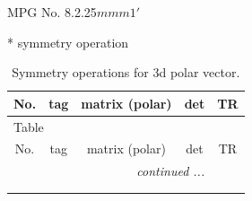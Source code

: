 \documentclass[fleqn,8pt]{jsarticle}
\begin{document}
\setcounter{MaxMatrixCols}{32}

\renewcommand{\tablename}{Table~}
\renewcommand{\figurename}{Figure~}
\begin{center}
\LARGE
MPG No. 8.2.25\quad$mmm1'$
\end{center}
* symmetry operation
\renewcommand{\arraystretch}{1.3}
\begin{longtable}{ccccc}
\caption{Symmetry operations for 3d polar vector.}
 \\
 \hline \hline
No. & tag & matrix (polar) & det & TR \\ \hline \endfirsthead

\multicolumn{4}{l}{\tablename\ \thetable{}} \\
 \hline \hline
No. & tag & matrix (polar) & det & TR \\ \hline \endhead

 \hline \hline
\multicolumn{4}{r}{\footnotesize\it continued ...} \\ \endfoot

 \hline \hline
\multicolumn{4}{r}{} \\ \endlastfoot


\end{longtable}
\end{document}
